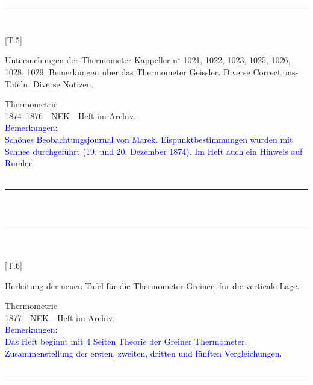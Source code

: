 \\
\vspace*{-2.5pt}\\
\parbox{\textwidth}{%
\rule{\textwidth}{1pt}\vspace*{-3mm}\\
\begin{minipage}[t]{0.2\textwidth}\vspace{0pt}
\Huge\rule[-4mm]{0cm}{1cm}[T.5]
\end{minipage}
\hfill
\begin{minipage}[t]{0.8\textwidth}\vspace{0pt}
\large Untersuchungen der Thermometer Kappeller n{$^\circ$} 1021, 1022, 1023, 1025, 1026, 1028, 1029. Bemerkungen über das Thermometer Geissler. Diverse Corrections-Tafeln. Diverse Notizen.\rule[-2mm]{0mm}{2mm}
\end{minipage}
{\footnotesize\flushright
Thermometrie\\
}
1874--1876\quad---\quad NEK\quad---\quad Heft im Archiv.\\
\textcolor{blue}{Bemerkungen:\\{}
Schönes Beobachtungsjournal von Marek. Eispunktbestimmungen wurden mit Schnee durchgeführt (19. und 20. Dezember 1874). Im Heft auch ein Hinweis auf Rumler.\\{}
}
\\[-15pt]
\rule{\textwidth}{1pt}
}
\\
\vspace*{-2.5pt}\\
\parbox{\textwidth}{%
\rule{\textwidth}{1pt}\vspace*{-3mm}\\
\begin{minipage}[t]{0.2\textwidth}\vspace{0pt}
\Huge\rule[-4mm]{0cm}{1cm}[T.6]
\end{minipage}
\hfill
\begin{minipage}[t]{0.8\textwidth}\vspace{0pt}
\large Herleitung der neuen Tafel für die Thermometer Greiner, für die verticale Lage.\rule[-2mm]{0mm}{2mm}
\end{minipage}
{\footnotesize\flushright
Thermometrie\\
}
1877\quad---\quad NEK\quad---\quad Heft im Archiv.\\
\textcolor{blue}{Bemerkungen:\\{}
Das Heft beginnt mit 4 Seiten {\glqq}Theorie der Greiner Thermometer{\grqq}. Zusammenstellung der ersten, zweiten, dritten und fünften Vergleichungen.\\{}
}
\\[-15pt]
\rule{\textwidth}{1pt}
}
